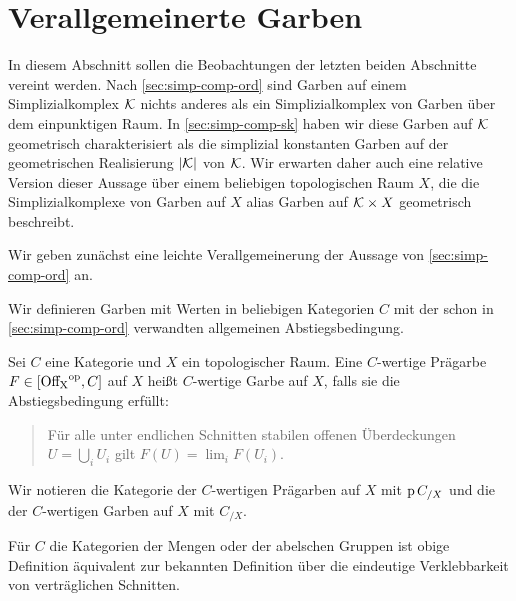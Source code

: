 
\section{Verallgemeinerte Garben}
\label{sec:gen-sheaves}

In diesem Abschnitt sollen die Beobachtungen der letzten beiden
Abschnitte vereint werden. Nach \autoref{sec:simp-comp-ord} sind
Garben auf einem Simplizialkomplex $\mathcal{K}$ nichts anderes als ein
Simplizialkomplex von Garben über dem einpunktigen Raum. In
\autoref{sec:simp-comp-sk} haben wir diese Garben auf $\mathcal{K}$ geometrisch
charakterisiert als die simplizial konstanten Garben auf der
geometrischen Realisierung $|\mathcal{K}|$ von $\mathcal{K}$. Wir erwarten daher auch
eine relative Version dieser Aussage über einem beliebigen
topologischen Raum $X$, die die Simplizialkomplexe von Garben auf $X$
alias Garben auf $\mathcal{K} \times X$ geometrisch beschreibt.

Wir geben zunächst eine leichte Verallgemeinerung der Aussage von
\ref{sec:simp-comp-ord} an.

Wir definieren Garben mit Werten in beliebigen Kategorien $C$ mit der
schon in \ref{sec:simp-comp-ord} verwandten allgemeinen
Abstiegsbedingung.
\begin{defn}[\cite{TG}, 2.1.5]
  Sei $C$ eine Kategorie und $X$ ein topologischer Raum. Eine
  $C$-wertige Prägarbe $F \in [\operatorname{Off_X}^\mathrm{op}, C]$ auf $X$ heißt $C$-wertige
  Garbe auf $X$, falls sie die Abstiegsbedingung erfüllt:
  \begin{quote}
    Für alle unter endlichen Schnitten stabilen offenen Überdeckungen
    $U = \bigcup_i U_i$ gilt $F(U) = \lim_i F(U_i)$.
  \end{quote}
\end{defn}
Wir notieren die Kategorie der $C$-wertigen Prägarben auf $X$ mit $\operatorname{p}
C_{/X}$ und die der $C$-wertigen Garben auf $X$ mit $C_{/X}$.

Für $C$ die Kategorien der Mengen oder der abelschen Gruppen ist obige
Definition äquivalent zur bekannten Definition über die eindeutige
Verklebbarkeit von verträglichen Schnitten.

